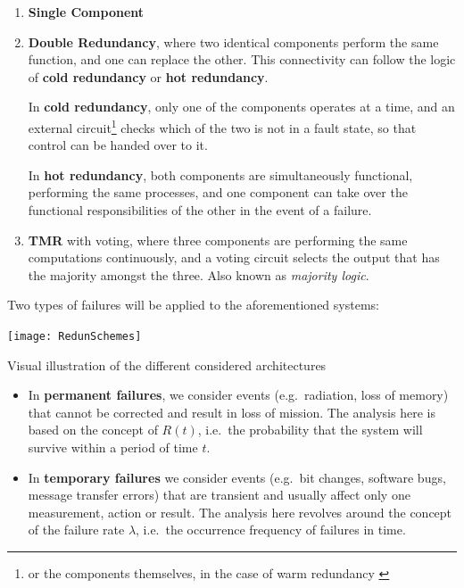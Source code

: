 \documentclass[a4paper,nobib]{tufte-book}
\def\e{\ignorespaces}
\def\acusepage#1{}
\begin{document}
\begin{enumerate}
	\item \textbf{Single Component}
	\item \textbf{Double Redundancy}, where two identical components perform the same function, and one can replace the other. This connectivity can follow the logic of \textbf{cold redundancy} or \textbf{hot redundancy}.
	
	In \textbf{cold redundancy}, only one of the components operates at a time, and an external circuit\footnote{or the components themselves, in the case of warm redundancy \autocite[20]{SAVOIR-HB-003}} checks which of the two is not in a fault state, so that control can be handed over to it.

	In \textbf{hot redundancy}, both components are simultaneously functional, performing the same processes, and one component can take over the functional responsibilities of the other in the event of a failure.

	\item \textbf{\acf{TMR}} with voting, where three components are performing the same computations continuously, and a voting circuit selects the output that has the majority amongst the three. Also known as \emph{majority logic}.
\end{enumerate}

Two types of failures will be applied to the aforementioned systems:

\begin{marginfigure}
\centering
\texttt{[image: RedunSchemes]}
\caption{Visual illustration of the different considered architectures}
\acusepage{voter}
\end{marginfigure}
\begin{itemize}
\item In \textbf{permanent failures}, we consider events (e.g.\ radiation, loss of memory) that cannot be corrected and result in loss of mission. The analysis here is based on the concept of \e{reliability} \( R(t) \), i.e.\ the probability that the system will survive within a period of time \( t \).
\item In \textbf{temporary failures} we consider events (e.g.\ bit changes, software bugs, message transfer errors) that are transient and usually affect only one measurement, action or result. The analysis here revolves around the concept of the failure rate \( \lambda \), i.e.\ the occurrence frequency of failures in time.
\end{itemize}
\end{document}
